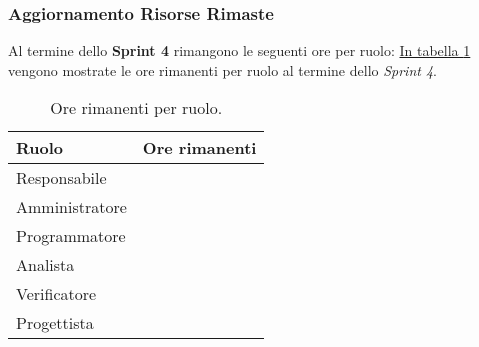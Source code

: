 \subsubsection{Aggiornamento Risorse Rimaste}
\label{sec:AggiornamentoRisorse_Sprint4}
Al termine dello \textbf{Sprint 4} rimangono le seguenti ore per ruolo: \hyperref[tab:sprint4_ore_rimanenti]{In tabella \ref{tab:sprint4_ore_rimanenti}} vengono mostrate le ore rimanenti per ruolo al termine dello \textit{Sprint 4}.

\begin{table}[H]
    \centering
    \begin{tabular}{| l | l |}
    \hline
    \textbf{Ruolo} & 
    \textbf{Ore rimanenti}\\
    \hline
        Responsabile & \\
    \hline
        Amministratore & \\
    \hline
        Programmatore & \\
    \hline
        Analista & \\
    \hline
        Verificatore & \\
    \hline
        Progettista & \\
    \hline
    \end{tabular}
    \caption{Ore rimanenti per ruolo.}
    \label{tab:sprint4_ore_rimanenti} 
\end{table}